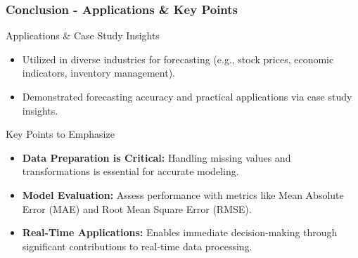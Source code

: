\documentclass[aspectratio=169]{beamer}
\begin{document}
\begin{frame}[fragile]
    \frametitle{Conclusion - Applications \& Key Points}
    \begin{block}{Applications & Case Study Insights}
        \begin{itemize}
            \item Utilized in diverse industries for forecasting (e.g., stock prices, economic indicators, inventory management).
            \item Demonstrated forecasting accuracy and practical applications via case study insights.
        \end{itemize}
    \end{block}

    \begin{block}{Key Points to Emphasize}
        \begin{itemize}
            \item \textbf{Data Preparation is Critical:} Handling missing values and transformations is essential for accurate modeling.
            \item \textbf{Model Evaluation:} Assess performance with metrics like Mean Absolute Error (MAE) and Root Mean Square Error (RMSE).
            \item \textbf{Real-Time Applications:} Enables immediate decision-making through significant contributions to real-time data processing.
        \end{itemize}
    \end{block}
\end{frame}
\end{document}
